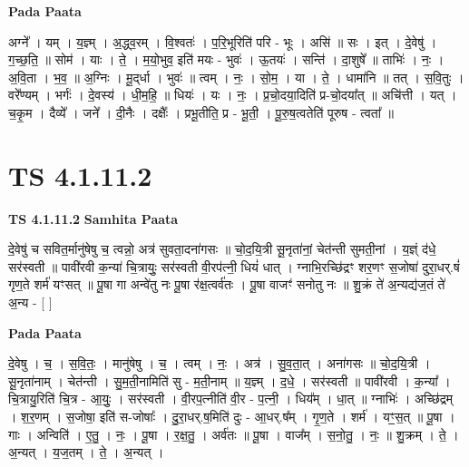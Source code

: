 \documentclass[17pt]{extarticle}
\begin{document}
\textbf{Pada Paata} \newline

अग्ने᳚ । यम् । य॒ज्ञ्म् । अ॒द्ध्व॒रम् । वि॒श्वतः॑ । प॒रि॒भूरिति॑ परि - भूः । असि॑ ॥ सः । इत् । दे॒वेषु॑ । ग॒च्छ॒ति॒ ॥ सोम॑ । याः । ते॒ । म॒यो॒भुव॒ इति॑ मयः - भुवः॑ । ऊ॒तयः॑ । सन्ति॑ । दा॒शुषे᳚ ॥ ताभिः॑ । नः॒ । अ॒वि॒ता । भ॒व॒ ॥ अ॒ग्निः । मू॒द्‌र्धा । भुवः॑ ॥ त्वम् । नः॒ । सो॒म॒ । या । ते॒ । धामा॑नि ॥ तत् । स॒वि॒तुः । वरे᳚ण्यम् । भर्गः॑ । दे॒वस्य॑ । धी॒म॒हि॒ ॥ धियः॑ । यः । नः॒ । प्र॒चो॒दया॒दिति॑ प्र-चो॒दया᳚त् ॥ अचि॑त्ती । यत् । च॒कृ॒म । दैव्ये᳚ । जने᳚ । दी॒नैः । दक्षैः᳚ । प्रभू॒तीति॒ प्र - भू॒ती॒ । पू॒रु॒ष॒त्वतेति॑ पूरुष - त्वता᳚ ॥  \newline





\section{ TS 4.1.11.2 }

\textbf{TS 4.1.11.2 } \newline
\textbf{Samhita Paata} \newline

दे॒वेषु॑ च सवित॒र्मानु॑षेषु च॒ त्वन्नो॒ अत्र॑ सुवता॒दना॑गसः ॥ चो॒द॒यि॒त्री सू॒नृता॑नां॒ चेत॑न्ती सुमती॒नां । य॒ज्ञ्ं द॑धे॒ सर॑स्वती ॥ पावी॑रवी क॒न्या॑ चि॒त्रायुः॒ सर॑स्वती वी॒रप॑त्नी॒ धियं॑ धात् । ग्नाभि॒रच्छि॑द्रꣳ शर॒णꣳ स॒जोषा॑ दुरा॒धर्.षं॑ गृण॒ते शर्म॑ यꣳसत् ॥ पू॒षा गा अन्वे॑तु नः पू॒षा र॑क्ष॒त्वर्व॑तः । पू॒षा वाजꣳ॑ सनोतु नः ॥ शु॒क्रं ते॑ अ॒न्यद्य॑ज॒तं ते॑ अ॒न्य - [  ] \newline

\textbf{Pada Paata} \newline

दे॒वेषु । च॒ । स॒वि॒तः॒ । मानु॑षेषु । च॒ । त्वम् । नः॒ । अत्र॑ । सु॒व॒ता॒त् । अना॑गसः ॥ चो॒द॒यि॒त्री । सू॒नृता॑नाम् । चेत॑न्ती । सु॒म॒ती॒नामिति॑ सु - म॒ती॒नाम् ॥ य॒ज्ञ्म् । द॒धे॒ । सर॑स्वती ॥ पावी॑रवी । क॒न्या᳚ । चि॒त्रायु॒रिति॑ चि॒त्र - आ॒युः॒ । सर॑स्वती । वी॒रप॒त्नीति॑ वी॒र - प॒त्नी॒ । धिय᳚म् । धा॒त् ॥ ग्नाभिः॑ । अच्छि॑द्रम् । श॒र॒णम् । स॒जोषा॒ इति॑ स-जोषाः᳚ । दु॒रा॒धर्.ष॒मिति॑ दुः - आ॒धर्.ष᳚म् । गृ॒ण॒ते । शर्म॑ । यꣳ॒॒स॒त् ॥ पू॒षा । गाः । अन्विति॑ । ए॒तु॒ । नः॒ । पू॒षा । र॒क्ष॒तु॒ । अर्व॑तः ॥ पू॒षा । वाज᳚म् । स॒नो॒तु॒ । नः॒ ॥ शु॒क्रम् । ते॒ । अ॒न्यत् । य॒ज॒तम् । ते॒ । अ॒न्यत् ।  \newline




\end{document}
